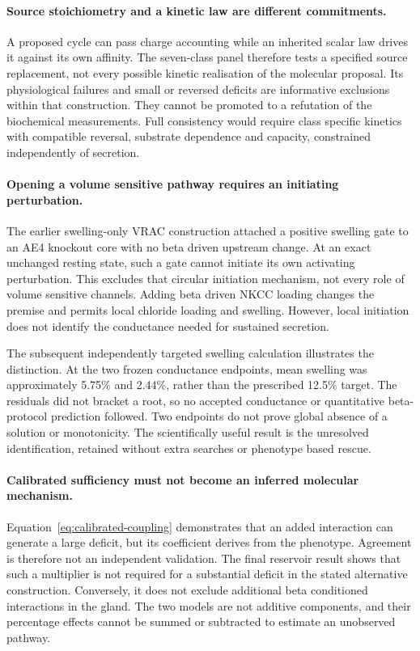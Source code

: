\documentclass[11pt]{article}
\begin{document}
\paragraph{Source stoichiometry and a kinetic law are different commitments.}
A proposed cycle can pass charge accounting while an inherited scalar law drives it against its own affinity. The seven-class panel therefore tests a specified source replacement, not every possible kinetic realisation of the molecular proposal. Its physiological failures and small or reversed deficits are informative exclusions within that construction. They cannot be promoted to a refutation of the biochemical measurements. Full consistency would require class specific kinetics with compatible reversal, substrate dependence and capacity, constrained independently of secretion.

\paragraph{Opening a volume sensitive pathway requires an initiating perturbation.}
The earlier swelling-only VRAC construction attached a positive swelling gate to an AE4 knockout core with no beta driven upstream change. At an exact unchanged resting state, such a gate cannot initiate its own activating perturbation. This excludes that circular initiation mechanism, not every role of volume sensitive channels. Adding beta driven NKCC loading changes the premise and permits local chloride loading and swelling. However, local initiation does not identify the conductance needed for sustained secretion.

The subsequent independently targeted swelling calculation illustrates the distinction. At the two frozen conductance endpoints, mean swelling was approximately 5.75\% and 2.44\%, rather than the prescribed 12.5\% target. The residuals did not bracket a root, so no accepted conductance or quantitative beta-protocol prediction followed. Two endpoints do not prove global absence of a solution or monotonicity. The scientifically useful result is the unresolved identification, retained without extra searches or phenotype based rescue.

\paragraph{Calibrated sufficiency must not become an inferred molecular mechanism.}
Equation~\eqref{eq:calibrated-coupling} demonstrates that an added interaction can generate a large deficit, but its coefficient derives from the phenotype. Agreement is therefore not an independent validation. The final reservoir result shows that such a multiplier is not required for a substantial deficit in the stated alternative construction. Conversely, it does not exclude additional beta conditioned interactions in the gland. The two models are not additive components, and their percentage effects cannot be summed or subtracted to estimate an unobserved pathway.
\end{document}
